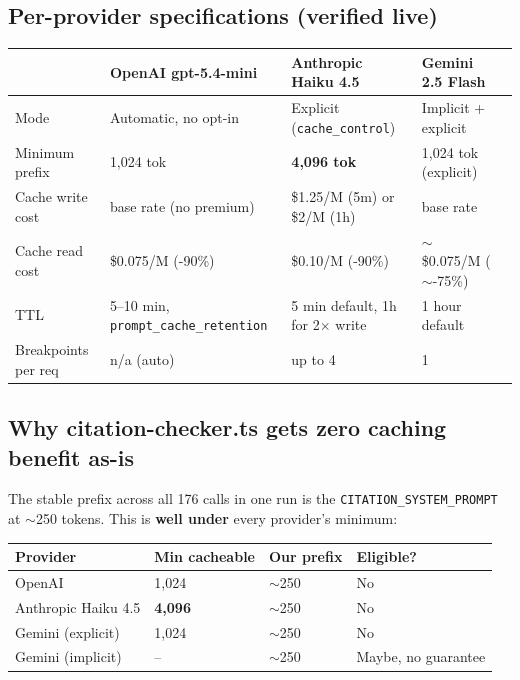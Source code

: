 \documentclass[11pt,letterpaper]{article}
\newcommand{\good}[1]{\textcolor{good}{#1}}
\newcommand{\warn}[1]{\textcolor{warn}{#1}}
\begin{document}
\subsection{Per-provider specifications (verified live)}

\begin{center}
\begin{tabular}{@{}lllll@{}}
\toprule
 & \textbf{OpenAI gpt-5.4-mini} & \textbf{Anthropic Haiku 4.5} & \textbf{Gemini 2.5 Flash} \\
\midrule
Mode & Automatic, no opt-in & Explicit (\texttt{cache\_control}) & Implicit + explicit \\
Minimum prefix & 1,024 tok & \warn{\textbf{4,096 tok}} & 1,024 tok (explicit) \\
Cache write cost & base rate (no premium) & \$1.25/M (5m) or \$2/M (1h) & base rate \\
Cache read cost & \$0.075/M (\good{-90\%}) & \$0.10/M (\good{-90\%}) & $\sim$\$0.075/M ($\sim$-75\%) \\
TTL & 5--10 min, \texttt{prompt\_cache\_retention} & 5 min default, 1h for 2$\times$ write & 1 hour default \\
Breakpoints per req & n/a (auto) & up to 4 & 1 \\
\bottomrule
\end{tabular}
\end{center}

\subsection{Why citation-checker.ts gets zero caching benefit as-is}

The stable prefix across all 176 calls in one run is the
\texttt{CITATION\_SYSTEM\_PROMPT} at $\sim$250 tokens. This is
\textbf{well under} every provider's minimum:

\begin{center}
\begin{tabular}{@{}llll@{}}
\toprule
\textbf{Provider} & \textbf{Min cacheable} & \textbf{Our prefix} & \textbf{Eligible?} \\
\midrule
OpenAI              & 1,024 & $\sim$250 & No \\
Anthropic Haiku 4.5 & \warn{\textbf{4,096}} & $\sim$250 & No \\
Gemini (explicit)   & 1,024 & $\sim$250 & No \\
Gemini (implicit)   & --    & $\sim$250 & Maybe, no guarantee \\
\bottomrule
\end{tabular}
\end{center}
\end{document}

